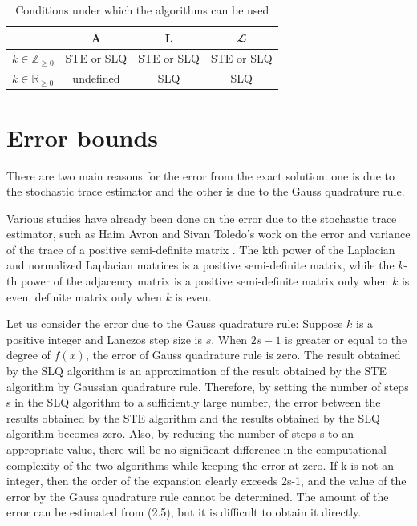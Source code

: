 \documentclass[senior,final,11pt]{iscs-thesis}
\begin{document}
\begin{table}[htb]
    \begin{center}
      \begin{tabular}{l| c c c }
       & ${\mathbf A}$ & ${\mathbf L}$ & ${\mathbfcal L}$ \\ \hline
        $k\in \mathbb{Z}_{\geq 0}$ & STE or SLQ  & STE or SLQ  & STE or SLQ \\
        $k\in \mathbb{R}_{\geq 0}$&  undefined  & SLQ  &  SLQ \\
      \end{tabular}
      \caption{Conditions under which the algorithms can be used}
      \label{tab:conditions_k}
    \end{center}
  \end{table}

\section{Error bounds}
There are two main reasons for the error from the exact solution: one is due to the stochastic trace estimator and the other is due to the Gauss quadrature rule.

Various studies have already been done on the error due to the stochastic trace estimator, such as Haim Avron and Sivan Toledo's work on the error and variance of the trace of a positive semi-definite matrix \cite{avron2011randomized}. The kth power of the Laplacian and normalized Laplacian matrices is a positive semi-definite matrix, while the $k$-th power of the adjacency matrix is a positive semi-definite matrix only when $k$ is even. definite matrix only when $k$ is even.

Let us consider the error due to the Gauss quadrature rule: Suppose $k$ is a positive integer and Lanczos step size is $s$. When $2s-1$ is greater or equal to the degree of $f(x)$, the error of Gauss quadrature rule is zero. The result obtained by the SLQ algorithm is an approximation of the result obtained by the STE algorithm by Gaussian quadrature rule. Therefore, by setting the number of steps s in the SLQ algorithm to a sufficiently large number, the error between the results obtained by the STE algorithm and the results obtained by the SLQ algorithm becomes zero. Also, by reducing the number of steps s to an appropriate value, there will be no significant difference in the computational complexity of the two algorithms while keeping the error at zero.
If k is not an integer, then the order of the expansion clearly exceeds 2s-1, and the value of the error by the Gauss quadrature rule cannot be determined. The amount of the error can be estimated from (2.5), but it is difficult to obtain it directly.
\end{document}

